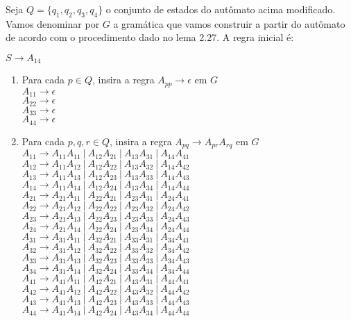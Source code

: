 Seja $Q = \{q_1, q_2, q_3, q_4\}$ o conjunto de estados do autômato acima modificado. Vamos denominar por $G$ a gramática que vamos construir a partir do autômato de acordo com o procedimento dado no lema 2.27. A regra inicial é:

$S \rightarrow A_{14}$

\begin{enumerate}[label={\textbf{\arabic*.}}]
    \item Para cada $p \in Q$, insira a regra $A_{pp} \rightarrow \epsilon$ em $G$\\[2pt]
    $A_{11} \rightarrow \epsilon$\\
    $A_{22} \rightarrow \epsilon$\\
    $A_{33} \rightarrow \epsilon$\\
    $A_{44} \rightarrow \epsilon$
    
    \item Para cada $p, q, r \in Q$, insira a regra $A_{pq} \rightarrow A_{pr}A_{rq}$ em $G$\\[2pt]
    $A_{11} \rightarrow A_{11}A_{11}\ |\ A_{12}A_{21}\ |\ A_{13}A_{31}\ |\ A_{14}A_{41}$\\
    $A_{12} \rightarrow A_{11}A_{12}\ |\ A_{12}A_{22}\ |\ A_{13}A_{32}\ |\ A_{14}A_{42}$\\
    $A_{13} \rightarrow A_{11}A_{13}\ |\ A_{12}A_{23}\ |\ A_{13}A_{33}\ |\ A_{14}A_{43}$\\
    $A_{14} \rightarrow A_{11}A_{14}\ |\ A_{12}A_{24}\ |\ A_{13}A_{34}\ |\ A_{14}A_{44}$\\[4pt]
    $A_{21} \rightarrow A_{21}A_{11}\ |\ A_{22}A_{21}\ |\ A_{23}A_{31}\ |\ A_{24}A_{41}$\\
    $A_{22} \rightarrow A_{21}A_{12}\ |\ A_{22}A_{22}\ |\ A_{23}A_{32}\ |\ A_{24}A_{42}$\\
    $A_{23} \rightarrow A_{21}A_{13}\ |\ A_{22}A_{23}\ |\ A_{23}A_{33}\ |\ A_{24}A_{43}$\\
    $A_{24} \rightarrow A_{21}A_{14}\ |\ A_{22}A_{24}\ |\ A_{23}A_{34}\ |\ A_{24}A_{44}$\\[4pt]
    $A_{31} \rightarrow A_{31}A_{11}\ |\ A_{32}A_{21}\ |\ A_{33}A_{31}\ |\ A_{34}A_{41}$\\
    $A_{32} \rightarrow A_{31}A_{12}\ |\ A_{32}A_{22}\ |\ A_{33}A_{32}\ |\ A_{34}A_{42}$\\
    $A_{33} \rightarrow A_{31}A_{13}\ |\ A_{32}A_{23}\ |\ A_{33}A_{33}\ |\ A_{34}A_{43}$\\
    $A_{34} \rightarrow A_{31}A_{14}\ |\ A_{32}A_{24}\ |\ A_{33}A_{34}\ |\ A_{34}A_{44}$\\[4pt]
    $A_{41} \rightarrow A_{41}A_{11}\ |\ A_{42}A_{21}\ |\ A_{43}A_{31}\ |\ A_{44}A_{41}$\\
    $A_{42} \rightarrow A_{41}A_{12}\ |\ A_{42}A_{22}\ |\ A_{43}A_{32}\ |\ A_{44}A_{42}$\\
    $A_{43} \rightarrow A_{41}A_{13}\ |\ A_{42}A_{23}\ |\ A_{43}A_{33}\ |\ A_{44}A_{43}$\\
    $A_{44} \rightarrow A_{41}A_{14}\ |\ A_{42}A_{24}\ |\ A_{43}A_{34}\ |\ A_{44}A_{44}$
    

\end{enumerate}
